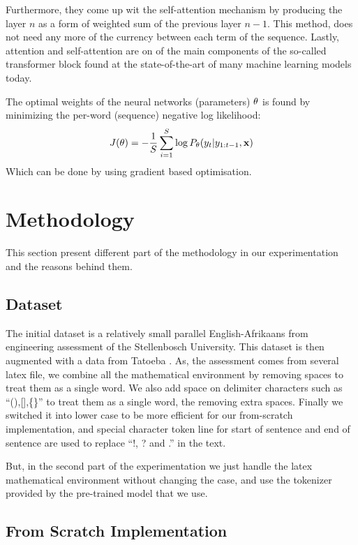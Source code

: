 Furthermore, they come up wit the self-attention mechanism by producing the layer  $n$ as a form of weighted sum of the previous layer $n-1$. This method, does not need any more of the currency between each term of the sequence. Lastly, attention and self-attention are on of the main components of the so-called transformer block found at the state-of-the-art of many machine learning models today.


The optimal weights of the neural networks (parameters) $\mathbf{\theta}$ is found by minimizing the per-word (sequence) negative log likelihood:
\begin{equation}
	J(\mathbf{\theta}) = -\frac{1}{S}\sum_{i=1}^{S}\log P_{\mathbf{\theta}}(y_t|y_{1:t-1}, \mathbf{x})
\end{equation}
Which can be done by using gradient based optimisation.

\section{Methodology}\label{mth}
This section present different part of the methodology in our experimentation and the reasons behind them.

\subsection{Dataset}
The initial dataset is a relatively small parallel English-Afrikaans from engineering assessment of the Stellenbosch University. This dataset is then augmented with a data from Tatoeba \cite{tatoeba}. As, the assessment comes from several latex file, we combine all the mathematical environment by removing spaces to treat them as a single word. We also add space on delimiter characters such as ``(),[],\{\}'' to treat them as a single word, the removing extra spaces. Finally we switched it into lower case to be more efficient for our from-scratch implementation, and special character token line for start of sentence and end of sentence are used to replace ``!, ? and .'' in the text.


But, in the second part of the experimentation we just handle the latex mathematical environment without changing the case, and use the tokenizer provided by the pre-trained model that we use.

\subsection{From Scratch Implementation}

